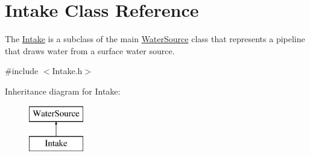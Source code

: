 \hypertarget{classIntake}{}\section{Intake Class Reference}
\label{classIntake}


The {\ttfamily \mbox{\hyperlink{classIntake}{Intake}}} is a subclass of the main {\ttfamily \mbox{\hyperlink{classWaterSource}{Water\+Source}}} class that represents a pipeline that draws water from a surface water source.  




{\ttfamily \#include $<$Intake.\+h$>$}

Inheritance diagram for Intake\+:\begin{figure}[H]
\begin{center}
\leavevmode
\includegraphics[height=2.000000cm]{classIntake}
\end{center}
\end{figure}
